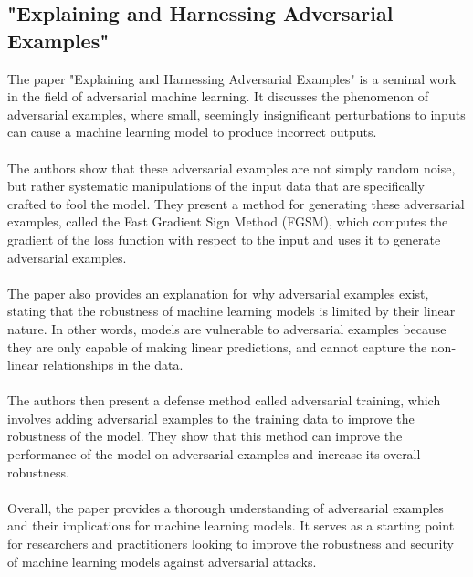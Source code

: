 \documentclass[paper=a4, fontsize=11pt]{scrartcl}
\numberwithin{equation}{section}		%
\numberwithin{figure}{section}			%
\numberwithin{table}{section}				%
\begin{document}
\subsection{"Explaining and Harnessing Adversarial Examples" \cite{Explaining and harnessing adversarial examples}}
The paper "Explaining and Harnessing Adversarial Examples" is a seminal work in the field of adversarial machine learning. It discusses the phenomenon of adversarial examples, where small, seemingly insignificant perturbations to inputs can cause a machine learning model to produce incorrect outputs.
\\
\\
The authors show that these adversarial examples are not simply random noise, but rather systematic manipulations of the input data that are specifically crafted to fool the model. They present a method for generating these adversarial examples, called the Fast Gradient Sign Method (FGSM), which computes the gradient of the loss function with respect to the input and uses it to generate adversarial examples.
\\
\\
The paper also provides an explanation for why adversarial examples exist, stating that the robustness of machine learning models is limited by their linear nature. In other words, models are vulnerable to adversarial examples because they are only capable of making linear predictions, and cannot capture the non-linear relationships in the data.
\\
\\
The authors then present a defense method called adversarial training, which involves adding adversarial examples to the training data to improve the robustness of the model. They show that this method can improve the performance of the model on adversarial examples and increase its overall robustness.
\\
\\
Overall, the paper provides a thorough understanding of adversarial examples and their implications for machine learning models. It serves as a starting point for researchers and practitioners looking to improve the robustness and security of machine learning models against adversarial attacks.
\end{document}
